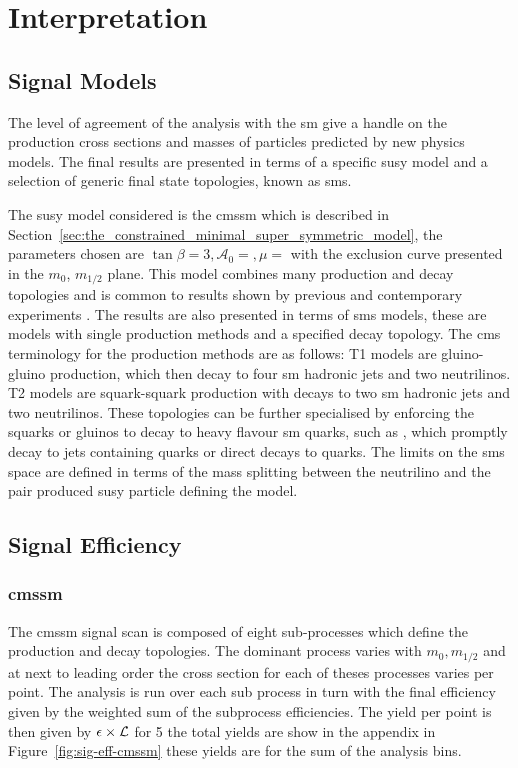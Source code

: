 \chapter{Interpretation} %
\label{cha:interpretation}


\section{Signal Models} %
\label{sec:signal_models}
The level of agreement of the analysis with the \ac{sm} give a handle on the 
production cross sections and masses of particles predicted by new physics 
models. The final results are presented in terms of a specific \ac{susy} model 
and a selection of generic final state topologies, known as \ac{sms}.

The \ac{susy} model considered is the \ac{cmssm}\cite{} which is described 
in Section~\ref{sec:the_constrained_minimal_super_symmetric_model}, the 
parameters chosen are $\tan\beta =3, \mathcal{A}_{0} = , \mu = $ with the 
exclusion curve presented in the $m_{0}$, $m_{1/2}$ plane. This model combines 
many production and decay topologies and is common to results shown by previous 
and contemporary experiments \cite{} .
The results are also presented in terms of \ac{sms}\cite{} models, these are 
models with single production methods and a specified decay topology. The 
\ac{cms} terminology for the production methods are as follows: T1 models are 
gluino-gluino production, which then decay to four \ac{sm} hadronic jets and 
two neutrilinos. T2 models are squark-squark production with decays to two 
\ac{sm} hadronic jets and two neutrilinos.
These topologies can be further specialised by enforcing the squarks or gluinos 
to decay to heavy flavour \ac{sm} quarks, such as \Ptop, which promptly decay 
to jets containing \Pbottom quarks or direct decays to \Pbottom quarks. The 
limits on the \ac{sms} space are defined in terms of the mass splitting between 
the neutrilino and the pair produced \ac{susy} particle defining the model.
\section{Signal Efficiency} %
\label{sub:signal_efficiency}
\subsection{\ac{cmssm}} %
\label{par:cmssm}
The \ac{cmssm} signal scan is composed of eight sub-processes which define the 
production and decay topologies. The dominant process varies with $m_{0}, 
m_{1/2}$ and at next to leading order the cross section for each of theses 
processes varies per point. The analysis is run over each sub process in turn 
with the final efficiency given by the weighted sum of the subprocess 
efficiencies. The yield per point is then given by 
$\epsilon\time\sigma\times\mathcal{L}$ for \unit{5}{\invfb} the total yields 
are show in the appendix in Figure~\ref{fig:sig-eff-cmssm} these yields are for 
the sum of the \HT analysis bins.

